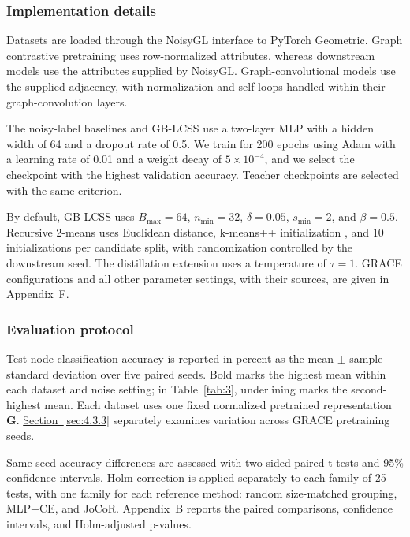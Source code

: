 \documentclass[a4paper,fleqn]{cas-sc}
\theoremstyle{definition}
\theoremstyle{plain}
\begin{document}
\subsubsection{Implementation details}\label{sec:4.1.4}

Datasets are loaded through the NoisyGL interface to PyTorch Geometric. Graph contrastive pretraining uses row-normalized attributes, whereas downstream models use the attributes supplied by NoisyGL. Graph-convolutional models use the supplied adjacency, with normalization and self-loops handled within their graph-convolution layers.

The noisy-label baselines and GB-LCSS use a two-layer MLP with a hidden width of 64 and a dropout rate of 0.5. We train for 200 epochs using Adam with a learning rate of 0.01 and a weight decay of \(5 \times 10^{- 4}\), and we select the checkpoint with the highest validation accuracy. Teacher checkpoints are selected with the same criterion.

By default, GB-LCSS uses \(B_{\max} = 64\), \(n_{\min} = 32\), \(\delta = 0.05\), \(s_{\min} = 2\), and \(\beta = 0.5\). Recursive 2-means uses Euclidean distance, k-means++ initialization \cite{ref71}, and 10 initializations per candidate split, with randomization controlled by the downstream seed. The distillation extension uses a temperature of \(\tau = 1\). GRACE configurations and all other parameter settings, with their sources, are given in Appendix~F.

\subsubsection{Evaluation protocol}\label{sec:4.1.5}

Test-node classification accuracy is reported in percent as the mean \ensuremath{\pm} sample standard deviation over five paired seeds. Bold marks the highest mean within each dataset and noise setting; in Table~\ref{tab:3}, underlining marks the second-highest mean. Each dataset uses one fixed normalized pretrained representation \(\mathbf G\). \hyperref[sec:4.3.3]{Section~\ref*{sec:4.3.3}} separately examines variation across GRACE pretraining seeds.

Same-seed accuracy differences are assessed with two-sided paired t-tests and 95\% confidence intervals. Holm correction \cite{ref72} is applied separately to each family of 25 tests, with one family for each reference method: random size-matched grouping, MLP+CE, and JoCoR. Appendix~B reports the paired comparisons, confidence intervals, and Holm-adjusted p-values.
\end{document}
